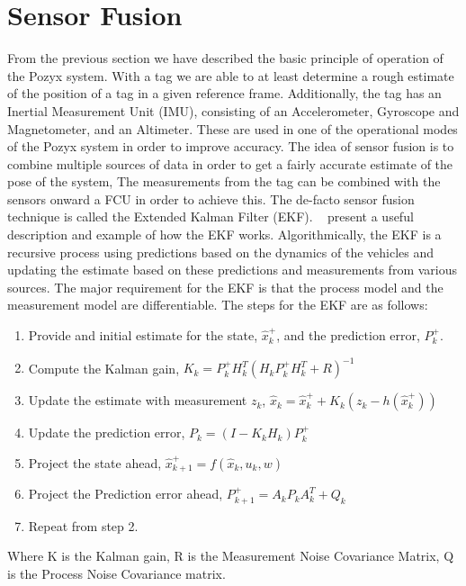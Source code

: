 \section*{Sensor Fusion}
From the previous section we have described the basic principle of operation of the Pozyx system.
With a tag we are able to at least determine a rough estimate of the position of a tag in a given reference frame.
Additionally, the tag has an Inertial Measurement Unit (IMU), consisting of an Accelerometer, Gyroscope and Magnetometer, and an Altimeter.
These are used in one of the operational modes of the Pozyx system in order to improve accuracy.
The idea of sensor fusion is to combine multiple sources of data in order to get a fairly accurate estimate of the pose of the system,
The measurements from the tag can be combined with the sensors onward a FCU in order to achieve this.
The de-facto sensor fusion technique is called the Extended Kalman Filter (EKF).
~\citet{simpleekf} present a useful description and example of how the EKF works.
Algorithmically, the EKF is a recursive process using predictions based on the dynamics of the vehicles and updating the estimate based on these predictions and measurements from various sources.
The major requirement for the EKF is that the process model and the measurement model are differentiable.
The steps for the EKF are as follows:
\begin{enumerate}
    \item Provide and initial estimate for the state, $\hat{x}^+_k$, and the prediction error, $P^+_k$.
    \item Compute the Kalman gain, $K_k = P^+_{k}H_k^T(H_k P^+_{k}H_k^T + R)^{-1}$
    \item Update the estimate with measurement $z_k$, $\hat{x}_k=\hat{x}^+_k + K_k(z_k - h(\hat{x}^+_k))$
    \item Update the prediction error, $P_k = (I - K_k H_k)P^+_{k}$
    \item Project the state ahead, $\hat{x}^+_{k+1} = f(\hat{x}_k, u_k, w)$
    \item Project the Prediction error ahead, $P^+_{k+1} = A_k P_k A_k^T + Q_k$
    \item Repeat from step 2.
\end{enumerate}
Where K is the Kalman gain, R is the Measurement Noise Covariance Matrix, Q is the Process Noise Covariance matrix.









